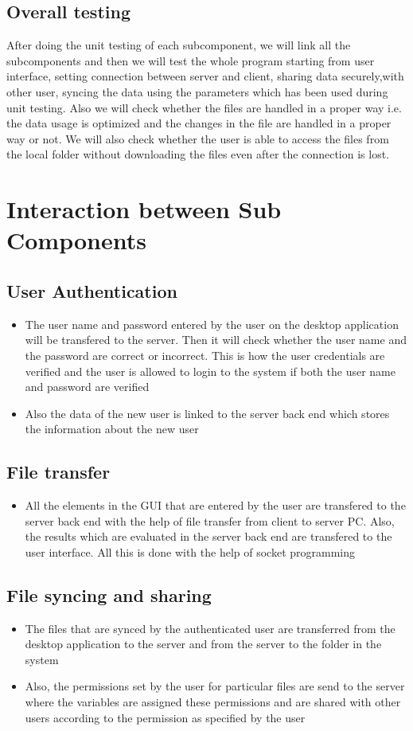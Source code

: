 \documentclass{article}
\begin{document}
		\subsection{Overall testing}
			After doing the unit testing of each subcomponent, we will link all the subcomponents and then we will test the whole program starting from user interface, setting connection between server and client, sharing data securely,with other user, syncing the data using the parameters which has been used during unit testing. Also we will check whether the files are handled in a proper way i.e. the data usage is optimized and the changes in the file are handled in a proper way or not. We will also check whether the user is able to access the files from the local folder without downloading the files even after the connection is lost.
	\section{Interaction between Sub Components}
		\subsection{User Authentication}
			\begin{itemize}
				\item The user name and password entered by the user on the desktop application will be transfered to the server. Then it will check whether the user name and the password are correct or incorrect. This is how the user credentials are verified and the user is allowed to login to the system if both the user name and password are verified
				\item Also the data of the new user is linked to the server back end which stores the information about the new user
			\end{itemize}
		\subsection{File transfer}
			\begin{itemize}
				\item All the elements in the GUI that are entered by the user are transfered to the server back end with the help of file transfer from client to server PC. Also, the results which are evaluated in the server back end are transfered to the user interface. All this is done with the help of socket programming
			\end{itemize}
		\subsection{File syncing and sharing}
			\begin{itemize}
				\item The files that are synced by the authenticated user are transferred from the desktop application to the server and from the server to the folder in the system
				\item Also, the permissions set by the user for particular files are send to the server where the variables are assigned these permissions and are shared with other users according to the permission as specified by the user
			\end{itemize}
\end{document}
